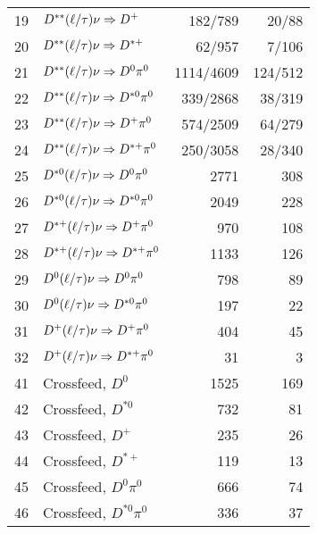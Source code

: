 \documentclass[6pt]{article}
\begin{document}
\begin{tabular}{r l r r }
19   & $D^{**}(\ell/\tau)\nu\Rightarrow D^+$                   &  182/789     &   20/88	 	  \\
20   & $D^{**}(\ell/\tau)\nu\Rightarrow D^{*+}$               &  62/957	     &   7/106      \\\hline 	 		          
21   & $D^{**}(\ell/\tau)\nu\Rightarrow D^0\pi^0$               &  1114/4609   &   124/512	       \\
22   & $D^{**}(\ell/\tau)\nu\Rightarrow D^{*0}\pi^0$           &  339/2868    &   38/319	       \\
23   & $D^{**}(\ell/\tau)\nu\Rightarrow D^+\pi^0$               &  574/2509    &   64/279	       \\
24   & $D^{**}(\ell/\tau)\nu\Rightarrow D^{*+}\pi^0$           &  250/3058    &   28/340	       \\
25   & $D^{*0}(\ell/\tau)\nu\Rightarrow D^0\pi^0$               &  2771	     &   308	       \\
26   & $D^{*0}(\ell/\tau)\nu\Rightarrow D^{*0}\pi^0$           &  2049	     &   228	       \\
27   & $D^{*+}(\ell/\tau)\nu\Rightarrow D^+\pi^0$               &  970	     &   108	 	  \\
28   & $D^{*+}(\ell/\tau)\nu\Rightarrow D^{*+}\pi^0$           &  1133	     &   126	       \\
29   & $D^{0}(\ell/\tau)\nu\Rightarrow D^0\pi^0$                &  798	     &   89	       \\
30   & $D^{0}(\ell/\tau)\nu\Rightarrow D^{*0}\pi^0$            &  197	     &   22	       \\
31   & $D^{+}(\ell/\tau)\nu\Rightarrow D^+\pi^0$                &  404	     &   45	 	  \\
32   & $D^{+}(\ell/\tau)\nu\Rightarrow D^{*+}\pi^0$            &  31          &   3              \\\hline
41   & Crossfeed, $D^{0} $                                    &  1525	     &   169	       \\
42   & Crossfeed, $D^{*0} $                                   &  732	     &   81	       \\
43   & Crossfeed, $D^{+} $                                    &  235	     &   26	       \\
44   & Crossfeed, $D^{*+} $                                   &  119	     &   13	       \\
45   & Crossfeed, $D^{0} \pi^0$                               &  666	     &   74	       \\
46   & Crossfeed, $D^{*0} \pi^0$                              &  336	     &   37	       \\

\end{tabular}
\end{document}
